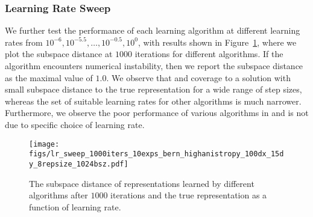 \ifshort
  \subsubsection{Learning Rate Sweep}
  \label{sec:sweep}
    We further test the performance of each learning algorithm at different learning rates from \(10^{-6}, 10^{-5.5}, \ldots, 10^{-0.5}, 10^{0}\), with results shown in Figure~\ref{fig:lr_sweep}, where we plot the subspace distance at \(1000\) iterations for different algorithms.
    If the algorithm encounters numerical instability, then we report the subspace distance as the maximal value of \(1.0\). We observe that \KFAC and \DFW  coverage to a solution with small subspace distance to the true representation for a wide range of step sizes, whereas the set of suitable learning rates for other algorithms is much narrower. Furthermore, we observe the poor performance of various algorithms in  and  is not due to specific choice of learning rate.
    
    
    \begin{figure}[ht]
    \centering
    \texttt{[image: figs/lr\_sweep\_1000iters\_10exps\_bern\_highanistropy\_100dx\_15dy\_8repsize\_1024bsz.pdf]}
    \caption{The subspace distance of representations learned by different algorithms after $1000$ iterations and the true representation as a function of learning rate.}
    \label{fig:lr_sweep}
    \end{figure}
\else
\fi

